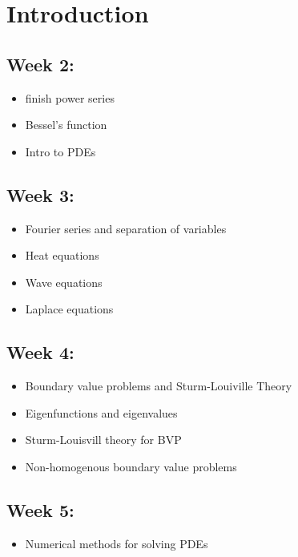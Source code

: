 
\section{Introduction}

\subsection{Week 2:}

\begin{itemize}
    \item finish power series
    \item Bessel's function
    \item Intro to PDEs
\end{itemize}

\subsection{Week 3:}

\begin{itemize}
    \item Fourier series and separation of variables
    \item Heat equations
    \item Wave equations
    \item Laplace equations
\end{itemize}

\subsection{Week 4:}

\begin{itemize}
    \item Boundary value problems and Sturm-Louiville Theory
    \item Eigenfunctions and eigenvalues
    \item Sturm-Louisvill theory for BVP
    \item Non-homogenous boundary value problems
\end{itemize}

\subsection{Week 5:}

\begin{itemize}
    \item Numerical methods for solving PDEs
\end{itemize}

